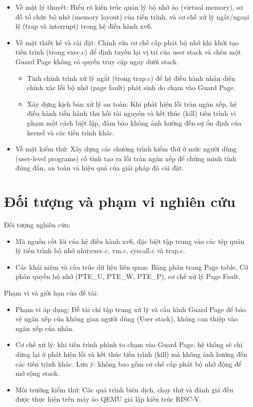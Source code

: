 \begin{itemize}

     \item Về mặt lý thuyết: Hiểu rõ kiến trúc quản lý bộ nhớ ảo (virtual memory), sơ đồ tổ chức bộ nhớ (memory layout) của tiến trình, và cơ chế xử lý ngắt/ngoại lệ (trap và interrupt) trong hệ điều hành xv6.

     \item Về mặt thiết kế và cài đặt: Chỉnh sửa cơ chế cấp phát bộ nhớ khi khởi tạo tiến trình (trong exec.c) để định tuyến lại vị trí của user stack và chèn một Guard Page không có quyền truy cập ngay dưới stack.
     \begin{itemize}
         \item Tinh chỉnh trình xử lý ngắt (trong trap.c) để hệ điều hành nhận diện chính xác lỗi bộ nhớ (page fault) phát sinh do chạm vào Guard Page.
         \item Xây dựng kịch bản xử lý an toàn: Khi phát hiện lỗi tràn ngăn xếp, hệ điều hành tiến hành thu hồi tài nguyên và kết thúc (kill) tiến trình vi phạm một cách biệt lập, đảm bảo không ảnh hưởng đến sự ổn định của kernel và các tiến trình khác.
     \end{itemize}

      \item Về mặt kiểm thử: Xây dựng các chương trình kiểm thử ở mức người dùng (user-level programs) cố tình tạo ra lỗi tràn ngăn xếp để chứng minh tính đúng đắn, an toàn và hiệu quả của giải pháp đã cài đặt.

   
\end{itemize} 
\section{Đối tượng và phạm vi nghiên cứu}
Đối tượng nghiên cứu:
\begin{itemize}
    \item Mã nguồn cốt lõi của hệ điều hành xv6, đặc biệt tập trung vào các tệp quản lý tiến trình bộ nhớ như:exec.c, vm.c, syscall.c và trap.c.
    \item Các khái niệm và cấu trúc dữ liệu liên quan: Bảng phân trang Page table, Cờ phân quyền bộ nhớ (PTE\_U, PTE\_W, PTE\_P), cơ chế xử lý Page Fault.
\end{itemize}
Phạm vi và giới hạn của đề tài: 
\begin{itemize}
    \item Phạm vi áp dụng: Đề tài chỉ tập trung xử lý và cấu hình Guard Page để bảo vệ ngăn xếp của không gian người dùng (User stack), không can thiệp vào ngăn xếp của nhân.
    \item Cơ chế xử lý: khi tiến trình phình to chạm vào Guard Page, hệ thống sẽ chỉ dừng lại ở phát hiện lỗi và kết thúc tiến trình (kill) mà không ảnh hưởng đến các tiến trình khác. Lưu ý: không bao gồm cơ chế cấp phát bộ nhớ động để mở rộng stack.
    \item Môi trường kiểm thử: Các quá trình biên dịch, chạy thử và đánh giá đều được thực hiện trên máy ảo QEMU giả lập kiến trúc RISC-V.
\end{itemize}
